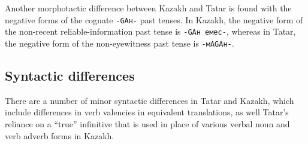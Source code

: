 \documentclass[11pt]{article}
\begin{document}
Another morphotactic difference between Kazakh and Tatar is found with the negative forms of the 
cognate \texttt{-GAн-} past tenses.  In Kazakh, the negative form of the non-recent reliable-information past tense 
is \texttt{-GAн емес-}, whereas in Tatar, the negative form of the non-eyewitness past tense is \texttt{-мAGAн-}.


%

%

\subsection{Syntactic differences}

There are a number of minor syntactic differences in Tatar and Kazakh, which include differences in verb valencies in equivalent translations, as well Tatar's reliance on a ``true'' infinitive that is used in place of various verbal noun and verb adverb forms in Kazakh.
\end{document}
